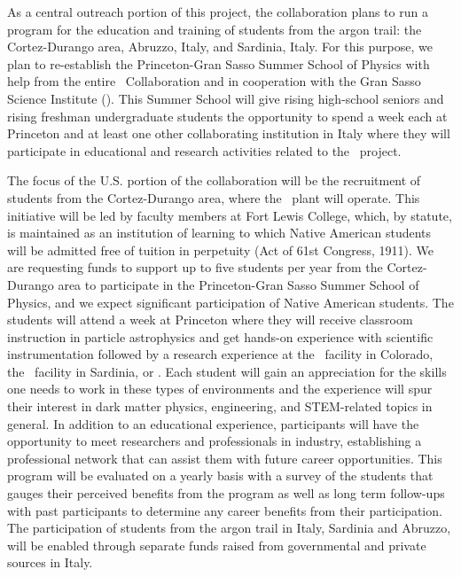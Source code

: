 As a central outreach portion of this project, the collaboration plans to run a program for the education and training of students from the argon trail: the Cortez-Durango area, Abruzzo, Italy, and Sardinia, Italy. For this purpose, we plan to re-establish the Princeton-Gran Sasso Summer School of Physics with help from the entire \GADMC\ Collaboration and in cooperation with the Gran Sasso Science Institute (\GSSI). This Summer School will give rising high-school seniors and rising freshman undergraduate students the opportunity to spend a week each at Princeton and at least one other collaborating institution in Italy where they will participate in educational and research activities related to the \DSk\ project. 

The focus of the U.S. portion of the collaboration will be the recruitment of students from the Cortez-Durango area, where the \Urania\ plant will operate.  This initiative will be led by faculty members at Fort Lewis College, which, by statute, is maintained as an institution of learning to which Native American students will be admitted free of tuition in perpetuity (Act of 61st Congress, 1911). 
We are requesting funds to support up to five students per year from the Cortez-Durango area to participate in the Princeton-Gran Sasso Summer School of Physics, and we expect significant participation of Native American students.  The students will attend a week at Princeton where they will receive classroom instruction in particle astrophysics and get hands-on experience with scientific instrumentation followed by a research experience at the \Urania\ facility in Colorado, the \Aria\ facility in Sardinia, or \LNGS.  Each student will gain an appreciation for the skills one needs to work in these types of environments and the experience will spur their interest in dark matter physics, engineering, and STEM-related topics in general.  In addition to an educational experience, participants will have the opportunity to meet researchers and professionals in industry, establishing a professional network that can assist them with future career opportunities.  This program will be evaluated on a yearly basis with a survey of the students that gauges their perceived benefits from the program as well as long term follow-ups with past participants to determine any career benefits from their participation. The participation of students from the argon trail in Italy, Sardinia and Abruzzo, will be enabled through separate funds raised from governmental and private sources in Italy.

